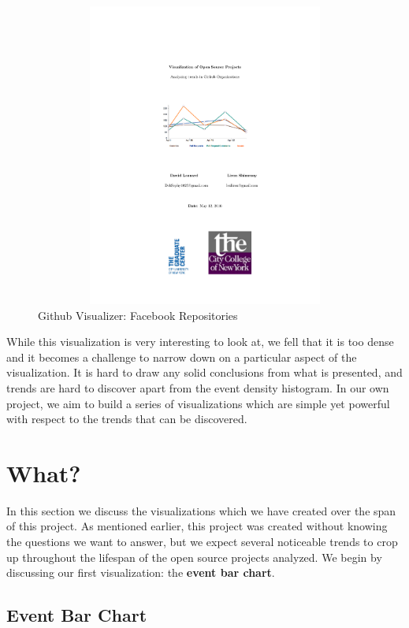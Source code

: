 \documentclass{article}
\begin{document}
\begin{figure}[h!]
\centering
\includegraphics[height=10cm, width=16cm]{viz}
\caption{Github Visualizer: Facebook Repositories}
\end{figure}

While this visualization is very interesting to look at, we fell that it is too dense and it becomes a challenge to narrow down on a particular aspect of the visualization. It is hard to draw any solid conclusions from what is presented, and trends are hard to discover apart from the event density histogram. In our own project, we aim to build a series of visualizations which are simple yet powerful with respect to the trends that can be discovered.

\section {What?}

In this section we discuss the visualizations which we have created over the span of this project. As mentioned earlier, this project was created without knowing the questions we want to answer, but we expect several noticeable trends to crop up throughout the lifespan of the open source projects analyzed. We begin by discussing our first visualization: the \textbf{event bar chart}.

\vspace{1.0cm}

\subsection {Event Bar Chart}
\end{document}
